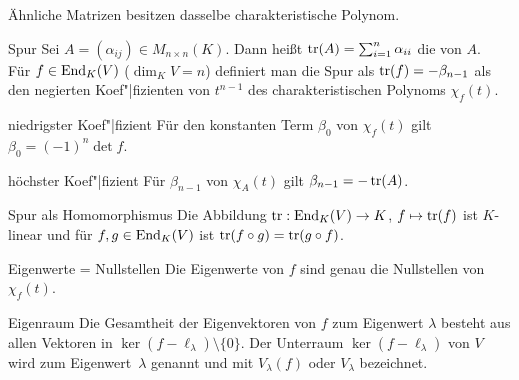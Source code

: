 \begin{Kor}
    Ähnliche Matrizen besitzen dasselbe charakteristische Polynom.
\end{Kor}

\begin{Def}{Spur}
    Sei $A = (\alpha_{ij}) \in M_{n \times n}(K)$.
    Dann heißt $\operatorname{tr}(A) = \sum_{i=1}^n \alpha_{ii}$ die
     von $A$. \\
    Für $f \in \operatorname{End}_K(V)$ ($\dim_K V = n$) definiert man die Spur als
    $\operatorname{tr}(f) = -\beta_{n-1}$ als den negierten Koef"|fizienten von $t^{n-1}$ des
    charakteristischen Polynoms $\chi_f(t)$.
\end{Def}

\begin{Satz}{niedrigster Koef"|fizient}
    Für den konstanten Term $\beta_0$ von $\chi_f(t)$ gilt
    $\beta_0 = (-1)^n \det f$.
\end{Satz}

\begin{Satz}{höchster Koef"|fizient}
    Für $\beta_{n-1}$ von $\chi_A(t)$ gilt $\beta_{n-1} = -\operatorname{tr}(A)$.
\end{Satz}

\begin{Satz}{Spur als Homomorphismus}
    Die Abbildung $\operatorname{tr}: \operatorname{End}_K(V) \rightarrow K$, $f \mapsto \operatorname{tr}(f)$ ist
    $K$-linear und für $f, g \in \operatorname{End}_K(V)$ ist
    $\operatorname{tr}(f \circ g) = \operatorname{tr}(g \circ f)$.
\end{Satz}

\begin{Satz}{Eigenwerte = Nullstellen}
    Die Eigenwerte von $f$ sind genau die Nullstellen von $\chi_f(t)$.
\end{Satz}

\begin{Def}{Eigenraum}
    Die Gesamtheit der Eigenvektoren von $f$ zum Eigenwert $\lambda$
    besteht aus allen Vektoren in $\ker(f - \ell_\lambda) \setminus \{0\}$.
    Der Unterraum $\ker(f - \ell_\lambda)$ von $V$ wird 
    zum Eigenwert~$\lambda$ genannt und mit $V_\lambda(f)$ oder $V_\lambda$
    bezeichnet.
\end{Def}

